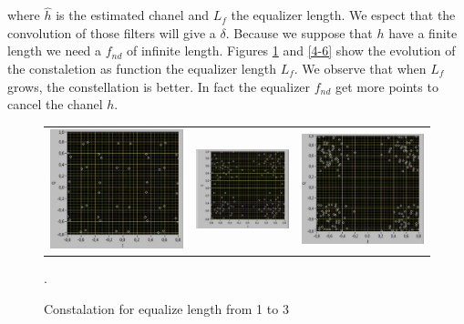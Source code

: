 \documentclass{article}
\begin{document}
        where $\hat{h}$ is the estimated chanel and $L_f$ the equalizer length. We espect that the convolution of those filters will give a $\delta$. Because we suppose that $h$ have a finite length we need a $f_{nd}$ of infinite length. Figures \ref{1-3} and \ref{4-6} show the evolution of the constaletion as function the equalizer length $L_f$. We observe that when $L_f$ grows, the constellation is better. In fact the equalizer $f_{nd}$ get more points to cancel the chanel $h$. 
    \begin{figure}[h]
        \centering
        \begin{tabular}{ccc}
            \includegraphics[width= 0.3 \textwidth]{eq1.png} & \includegraphics[width= 0.3 \textwidth]{eq2.png} & \includegraphics[width= 0.3 \textwidth]{eq3.png} \\
        \end{tabular}
        \caption{Constalation for equalize length from 1 to 3 \label{1-3}}.
    \end{figure}
\end{document}
